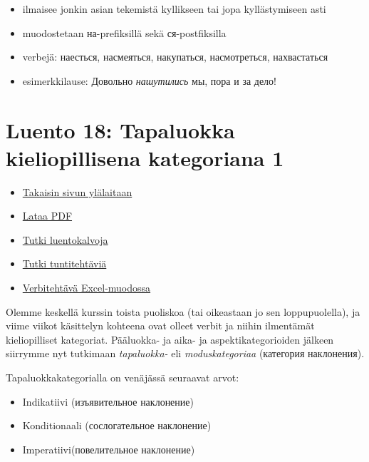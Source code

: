\documentclass[]{scrartcl}
\providecommand{\tightlist}{%
  \setlength{\itemsep}{0pt}\setlength{\parskip}{0pt}}
\begin{document}
\begin{enumerate}
  \begin{itemize}
  \tightlist
  \item
    ilmaisee jonkin asian tekemistä kyllikseen tai jopa kyllästymiseen
    asti
  \item
    muodostetaan на-prefiksillä sekä ся-postfiksilla
  \item
    verbejä: наесться, насмеяться, накупаться, насмотреться,
    нахвастаться
  \item
    esimerkkilause: Довольно \emph{нашутились} мы, пора и за дело!
  \end{itemize}
\end{enumerate}

\section{Luento 18: Tapaluokka kieliopillisena kategoriana
1}\label{luento-18-tapaluokka-kieliopillisena-kategoriana-1}

\begin{itemize}
\tightlist
\item
  \href{https://mustikka.uta.fi/~juho_harme/morfologia/\#tästä-kurssista}{Takaisin
  sivun ylälaitaan}
\item
  \href{http://mustikka.uta.fi/~juho_harme/morfologia/materiaalit/luento18.pdf}{Lataa
  PDF}
\item
  \href{http://mustikka.uta.fi/~juho_harme/morfologia/presentations/luento18.html}{Tutki
  luentokalvoja}
\item
  \href{http://mustikka.uta.fi/~juho_harme/morfologia/tehtavat/luento18.pdf}{Tutki
  tuntitehtäviä}
\item
  \href{http://mustikka.uta.fi/~juho_harme/morfologia/data/verbit_imperatiivi.xls}{Verbitehtävä
  Excel-muodossa}
\end{itemize}

Olemme keskellä kurssin toista puoliskoa (tai oikeastaan jo sen
loppupuolella), ja viime viikot käsittelyn kohteena ovat olleet verbit
ja niihin ilmentämät kieliopilliset kategoriat. Pääluokka- ja aika- ja
aspektikategorioiden jälkeen siirrymme nyt tutkimaan \emph{tapaluokka-}
eli \emph{moduskategoriaa} (категория наклонения).

Tapaluokkakategorialla on venäjässä seuraavat arvot:

\begin{itemize}
\tightlist
\item
  Indikatiivi (изъявительное наклонение)
\item
  Konditionaali (сослогательное наклонение)
\item
  Imperatiivi(повелительное наклонение)
\end{itemize}
\end{document}
